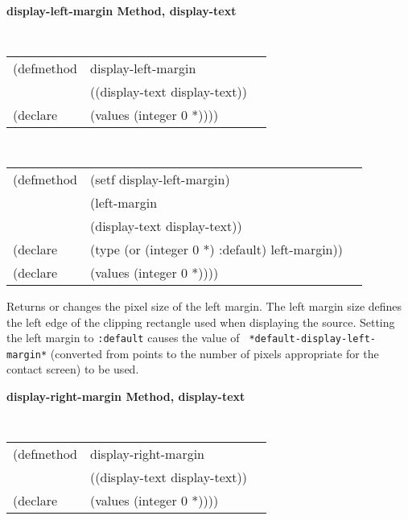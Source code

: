 {\samepage  
{\large {\bf display-left-margin \hfill Method, display-text}}
\begin{flushright} \parbox[t]{6.125in}{
\tt
\begin{tabular}{lll}
\raggedright
(defmethod & display-left-margin & \\
& ((display-text  display-text)) \\
(declare & (values (integer 0 *))))
\end{tabular}
\rm

}\end{flushright}}

\begin{flushright} \parbox[t]{6.125in}{
\tt
\begin{tabular}{lll}
\raggedright
(defmethod & (setf display-left-margin) & \\
         & (left-margin \\
         & (display-text  display-text)) \\
(declare &(type (or (integer 0 *) :default)  left-margin))\\
(declare & (values (integer 0 *))))
\end{tabular}
\rm}
\end{flushright}

\begin{flushright} \parbox[t]{6.125in}{
Returns or changes the pixel size of the
left margin.  The left margin size defines
the left edge of the clipping rectangle used when displaying the source.
Setting the left margin to {\tt :default} causes the value of {\tt
*default-display-left-margin*} (converted from points to the number of pixels
appropriate for the contact screen) to be used.
}
\end{flushright}




{\samepage  
{\large {\bf display-right-margin \hfill Method, display-text}}
\begin{flushright} \parbox[t]{6.125in}{
\tt
\begin{tabular}{lll}
\raggedright
(defmethod & display-right-margin & \\
& ((display-text  display-text)) \\
(declare & (values (integer 0 *))))
\end{tabular}
\rm

}\end{flushright}}

